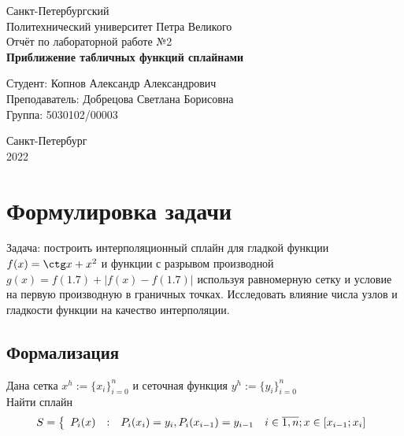 \documentclass[a4paper]{article}
\begin{document}
\begin{titlepage}
  \Large
  \begin{center}
    Санкт-Петербургский\\
    Политехнический университет Петра Великого\\
    \vspace{10em}
    Отчёт по лабораторной работе №2\\
    \vspace{2em}
    \textbf{Приближение табличных функций сплайнами}
  \end{center}
  \vspace{6em}
  \begin{flushright}
    Студент: Копнов Александр Александрович\\
    Преподаватель: Добрецова Светлана Борисовна\\
    Группа: 5030102/00003
  \end{flushright}
  \vspace{\fill}
  \begin{center}
    Санкт-Петербург\\
    2022
  \end{center}
\end{titlepage}
\pagebreak

\section{Формулировка задачи}
Задача: построить интерполяционный сплайн для гладкой функции $f(x) = \ctg x + x^{2}$ и функции с разрывом производной $g(x) = f(1.7) + |f(x) - f(1.7)|$ используя равномерную сетку и условие на первую производную в граничных точках. Исследовать влияние числа узлов и гладкости функции на качество интерполяции.
\subsection{Формализация}
Дана сетка $x^{h} := \{x_{i}\}_{i=0}^{n}$ и сеточная функция $y^{h}:=\{y_{i}\}_{i=0}^{n}$\\
Найти сплайн \[
  S = \left\{
\begin{array}{l@{\quad:\quad}l@{\quad}l}
 P_{i}(x)& P_{i}(x_{i}) = y_{i}, P_{i}(x_{i-1}) = y_{i-1} & i \in \overline{1,n}; x \in [x_{i-1};x_{i}]
\end{array}\right.
\]
\end{document}
